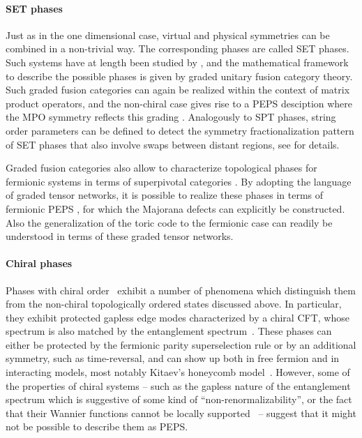 \documentclass[rmp,aps,reprint,superscriptaddress,nobalancelastpage]{revtex4-1}
\begin{document}
\paragraph{SET phases}
Just as in the one dimensional case, virtual and physical symmetries can be combined in a non-trivial way. The corresponding phases are called SET phases. Such systems have at length been studied by \cite{barkeshli:SET}, and the mathematical framework to describe the possible phases is given by graded unitary fusion category theory. Such graded fusion categories can again be realized within the context of matrix product operators, and the non-chiral case gives rise to a PEPS desciption where the MPO symmetry reflects this grading \cite{williamson:SET}. Analogously to SPT phases, string order parameters can be defined to detect the symmetry fractionalization pattern of SET phases that also involve swaps between distant regions, see \citet{Garre_Rubio_2019} for details.


Graded fusion categories also allow to characterize topological phases for fermionic systems in terms of superpivotal categories \cite{aasen2019fermion}. By adopting the language of graded tensor networks, it is possible to realize these phases in terms of fermionic PEPS \cite{bultinck:fermionicPEPS}, for which the Majorana defects can explicitly be constructed. Also the generalization of the toric code to the fermionic case \cite{gu2014lattice}  can readily be understood in terms of these graded tensor networks.

\paragraph{Chiral phases}

Phases with chiral order~\cite{bernevig:book-topo-ins} exhibit a number of phenomena which distinguish them from the non-chiral topologically ordered states discussed above. In particular, they exhibit protected gapless edge modes characterized by a chiral CFT, whose spectrum is also matched by the entanglement spectrum~\cite{li:es-qhe-sphere}. These phases can either be protected by the fermionic parity superselection rule or by an additional symmetry, such as time-reversal, and can show up both in free fermion and in interacting models, most notably Kitaev's honeycomb model~\cite{kitaev:honeycomb-model}.
However, some of the properties of chiral systems -- such as the gapless nature of the entanglement spectrum which is suggestive of some kind of ``non-renormalizability'', or the fact that their Wannier functions cannot be locally supported~\cite{kohn:wannier-functions} -- suggest that it might not be possible to describe them as PEPS.
\end{document}
